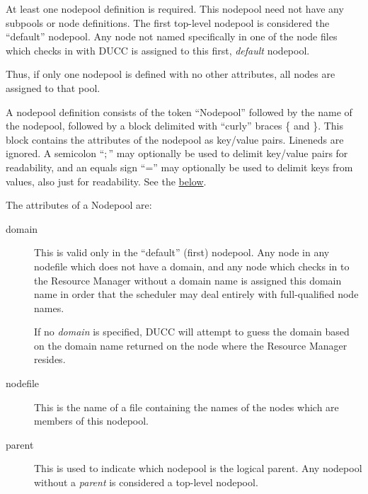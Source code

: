     At least one nodepool definition is required.  This nodepool need not have any subpools or node
    definitions.  The first top-level nodepool is considered the ``default'' nodepool.  Any node not
    named specifically in one of the node files which checks in with DUCC is assigned to this
    first, {\em default} nodepool. 

    Thus, if only one nodepool is defined with no other attributes, all nodes are
    assigned to that pool.

    A nodepool definition consists of the token ``Nodepool'' followed by the 
    name of the nodepool, followed by a block delimited with ``curly'' braces \{ and \}.  This
    block contains the attributes of the nodepool as key/value pairs.
    Lineneds are ignored.  A semicolon ``$;$'' may optionally be used to
    delimit key/value pairs for readability, and an equals sign ``='' may optionally
    be used to delimit keys from values, also just for readability.  See the 
    \hyperref[fig:nodepool.configuration]{below}.

    The attributes of a Nodepool are:
    \begin{description}
      \item[domain] This is valid only in the ``default'' (first) nodepool.  Any node
        in any nodefile which does not have a domain, and any node which checks
        in to the Resource Manager without a domain name is assigned this domain name
        in order that the scheduler may deal entirely with full-qualified node names.

        If no {\em domain} is specified, DUCC will attempt to guess the domain based
        on the domain name returned on the node where the Resource Manager resides.

      \item[nodefile] This is the name of a file containing the names of the nodes
        which are members of this nodepool.

      \item[parent] This is used to indicate which nodepool is the logical parent.
        Any nodepool without a {\em parent} is considered a top-level nodepool.
    \end{description}
        

